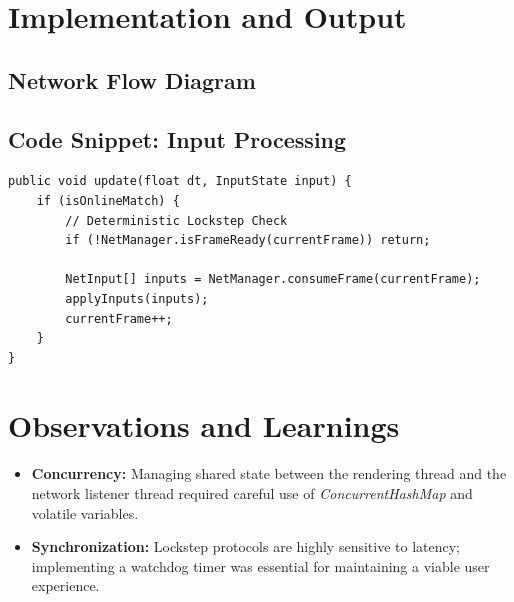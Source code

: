 \documentclass[a4paper,12pt]{article}
\begin{document}
\newpage

\section{Implementation and Output}

\subsection{Network Flow Diagram}
\begin{center}
\end{center}

\subsection{Code Snippet: Input Processing}
\begin{lstlisting}
public void update(float dt, InputState input) {
    if (isOnlineMatch) {
        // Deterministic Lockstep Check
        if (!NetManager.isFrameReady(currentFrame)) return;
        
        NetInput[] inputs = NetManager.consumeFrame(currentFrame);
        applyInputs(inputs);
        currentFrame++;
    }
}
\end{lstlisting}

\section{Observations and Learnings}
\begin{itemize}
    \item \textbf{Concurrency:} Managing shared state between the rendering thread and the network listener thread required careful use of \textit{ConcurrentHashMap} and volatile variables.
    \item \textbf{Synchronization:} Lockstep protocols are highly sensitive to latency; implementing a watchdog timer was essential for maintaining a viable user experience.
\end{itemize}
\end{document}
